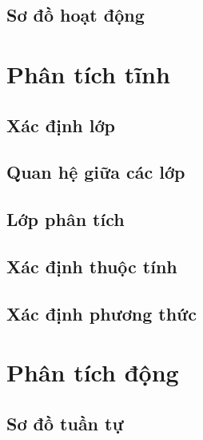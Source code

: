 \documentclass[12pt]{article}
\begin{document}
  \subsection{Sơ đồ hoạt động}

\section{Phân tích tĩnh}

  \subsection{Xác định lớp}

  \subsection{Quan hệ giữa các lớp}

  \subsection{Lớp phân tích}

  \subsection{Xác định thuộc tính}

  \subsection{Xác định phương thức}

\section{Phân tích động}

  \subsection{Sơ đồ tuần tự}

\begin{thebibliography}{9}
\end{thebibliography}
\end{document}
